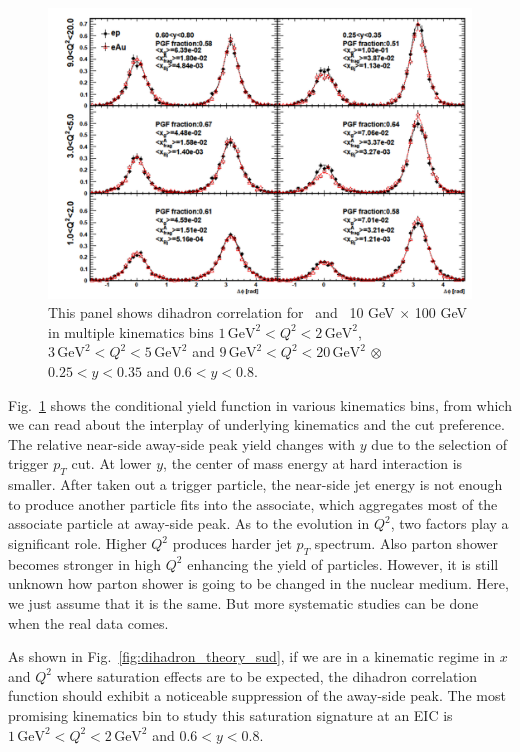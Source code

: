 \begin{figure}
\begin{center}
\includegraphics[width=1.0\textwidth]{plots/chpt6/10x100_multiBin_correlation.png}
\end{center} 
\caption[Dihadron correlation in multiple bins]{This panel shows dihadron correlation for \ep\ and \eAu\ 10 GeV $\times$ 100 GeV in multiple kinematics bins $1\, \textrm{GeV}^{2}<Q^{2}<2 \, \mathrm{GeV}^{2}$, $3\, \textrm{GeV}^{2}<Q^{2}<5 \,
\mathrm{GeV}^{2}$ and $9\, \textrm{GeV}^{2}<Q^{2}<20 \, \mathrm{GeV}^{2}$ $\otimes $
$0.25<y<0.35$ and $0.6<y<0.8$.}
\label{fig:dihadronMulti} 
\end{figure}

Fig.~\ref{fig:dihadronMulti} shows the conditional yield function in various
kinematics bins, from which we can read about the interplay of
underlying kinematics and the cut preference. The relative near-side away-side
peak yield changes with $y$ due to the selection of trigger $p_{T}$ cut. At
lower $y$, the center of mass energy at hard interaction is smaller. After taken
out a trigger particle, the near-side jet energy is not enough to produce
another particle fits into the associate, which aggregates most of the associate
particle at away-side peak. As to the evolution in $Q^{2}$, two factors play a
significant role. Higher $Q^{2}$ produces harder jet $p_{T}$ spectrum. Also
parton shower becomes stronger in high $Q^{2}$ enhancing the yield of particles.
However, it is still unknown how parton shower is going to be changed in the nuclear
medium. Here, we just assume that it is the same. But more systematic
studies can be done when the real data comes.


As shown in Fig.~\ref{fig:dihadron_theory_sud}, if we are in a kinematic regime
in $x$ and $Q^2$ where saturation effects are to be expected, the dihadron
correlation function should exhibit a noticeable suppression of the away-side
peak. The most promising kinematics bin to study this saturation signature at an
EIC is $1\, \textrm{GeV}^{2}<Q^{2}<2 \, \mathrm{GeV}^{2}$ and $0.6<y<0.8$.

